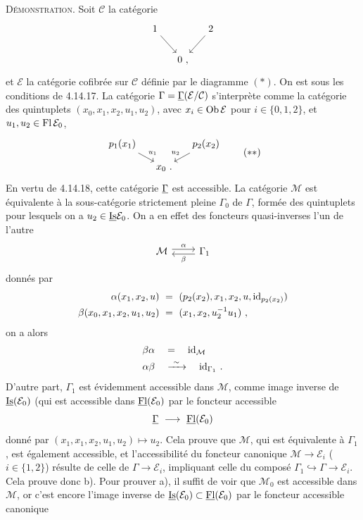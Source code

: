 \noindent\textsc{Démonstration}. Soit $\mathcal{C}$ la catégorie
\[
\begin{tikzcd}[column sep=small]
1 \arrow[dr] & & 2 \arrow[dl] \\
& 0 \ , &
\end{tikzcd}
\]
et $\mathcal{E}$ la catégorie cofibrée sur $\mathcal{C}$ définie par le diagramme $(*)$. On est sous les conditions de 4.14.17. La catégorie $\Gamma = \underline{\Gamma}(\mathcal{E}/\mathcal{C})$ s’interprète
comme la catégorie des quintuplets $(x_0,x_1,x_2,u_1,u_2)$, avec $x_i \in \operatorname{Ob}\mathcal{E}$ pour $i \in \{0,1,2\}$, et $u_1, u_2 \in \operatorname{Fl}\mathcal{E}_0$,
\[
\begin{tikzcd}[column sep=small, row sep=small]
p_1(x_1) \arrow[dr, "u_1"] & & p_2(x_2) \arrow[dl, "u_2"'] \\
& x_0 \ . &
\end{tikzcd}
\tag*{$(**)$}
\]
En vertu de 4.14.18, cette catégorie $\underline{\Gamma}$ est accessible. La catégorie $\mathcal{M}$ est équivalente à la sous-catégorie strictement pleine $\Gamma_0$ de $\Gamma$, formée des quintuplets pour lesquels on a $u_2 \in \underline{\mathrm{Is}}\mathcal{E}_0$. On a en effet des foncteurs quasi-inverses l’un de l’autre %
\[
\begin{tikzcd}
\mathcal{M} \arrow[r, shift left, "\alpha"] & \Gamma_1 \arrow[l, shift left, "\beta"]
\end{tikzcd}
\]
donnés par
\[
\begin{aligned}
\alpha(x_1,x_2,u) \ &= \ (p_2(x_2),x_1,x_2,u,\mathrm{id}_{p_2(x_2)})\\
\beta(x_0,x_1,x_2,u_1,u_2) \ &= \ (x_1,x_2,u_2^{-1}u_1) \ ,
\end{aligned}
\]
on a alors
\[
\begin{aligned}
\beta\alpha \quad &= \quad \mathrm{id}_{\mathcal{M}}\\
\alpha\beta \quad &\xrightarrow{\ \sim\ } \quad \mathrm{id}_{\Gamma_1} \ .
\end{aligned}
\]
D’autre part, $\Gamma_1$ est évidemment accessible dans $\mathcal{M}$, comme image inverse de $\underline{\mathrm{Is}}(\mathcal{E}_0)$ (qui %
{}
est accessible dans $\underline{\mathrm{Fl}}(\mathcal{E}_0)$ par le foncteur accessible
\[
\uGamma \ \longrightarrow \ \uFl(\mathcal{E}_0)
\]
donné par $(x_1, x_1, x_2, u_1, u_2) \longmapsto u_2$. Cela prouve que $\mathcal{M}$, qui est équivalente à $\Gamma_1$, est également accessible, et l’accessibilité du foncteur canonique $\mathcal{M} \longrightarrow \mathcal{E}_i$ ($i \in \{1,2\}$) résulte de celle de $\Gamma \longrightarrow \mathcal{E}_i$, impliquant celle du composé $\Gamma_1 \hookrightarrow \Gamma \longrightarrow \mathcal{E}_i$. Cela prouve donc b). Pour prouver a), il suffit de voir que $\mathcal{M}_0$ est accessible dans $\mathcal{M}$, or c’est encore l’image inverse de $\underline{\mathrm{Is}}(\mathcal{E}_0) \subset \underline{\mathrm{Fl}}(\mathcal{E}_0)$ par le foncteur accessible canonique %
